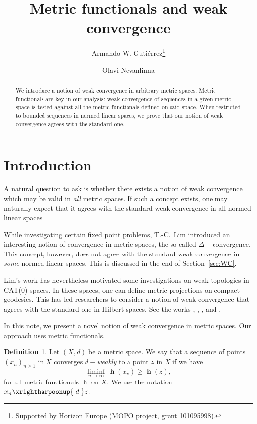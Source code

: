 \documentclass[a4paper,12pt]{article}
\title{\bf Metric functionals and weak convergence}
\author[1]{Armando W. Guti\'{e}rrez\thanks{
	Supported by Horizon Europe (MOPO project, grant 101095998).}}
\affil[1]{\itshape\small VTT Technical 
Research Centre of Finland \protect\\ 
\emph{armando.w.gutierrez@vtt.fi}}
\author[2]{Olavi Nevanlinna}
\affil[2]{\itshape\small Department of 
Mathematics and Systems Analysis, 
Aalto University \protect\\ 
\emph{olavi.nevanlinna@aalto.fi}}
\date{}
\theoremstyle{definition}
\newtheorem{defn}[thm]{Definition}
\DeclareMathOperator{\h}{\mathbf{h}}
\numberwithin{equation}{section}
\begin{document}
\maketitle

\begin{abstract}
We introduce a notion of weak convergence in arbitrary metric spaces. Metric 
functionals are key in our analysis: weak convergence of sequences in a given 
metric space is tested against all the metric functionals defined on said space. 
When restricted to bounded sequences in normed linear spaces, we prove that 
our notion of weak convergence agrees with the standard one.
\end{abstract}

\section{Introduction}

A natural question to ask is whether there exists a notion of weak convergence 
which may be valid in \emph{all} metric spaces. If such a concept exists, one may
naturally expect that it agrees with the standard weak convergence in all normed 
linear spaces. 

While investigating certain fixed point problems, T.-C.~Lim \cite{Lim1977}
introduced an interesting notion of convergence in metric spaces, the so-called 
$\Delta-$convergence. This concept, however, does not agree with the standard weak 
convergence in \emph{some} normed linear spaces. This is discussed in the end of
Section~\ref{sec:WC}. 

Lim's work has nevertheless motivated some investigations on weak topologies in 
{CAT}($0$) spaces. In these spaces, one can define metric projections on compact 
geodesics. This has led researchers to consider a notion of weak convergence 
that agrees with the standard one in Hilbert spaces. See the works 
\cite{Kirk2008}, \cite{Espinola-Fernandez2009},
\cite{Bacak2023}, and \cite{Lytchak-Petrunin2023}. 

In this note, we present a novel notion of weak convergence in metric spaces. Our 
approach uses metric functionals. 

\begin{defn}\label{def:WeakConv}
Let $(X,d)$ be a metric space. We say that a sequence of points $(x_n)_{n\geq 1}$ 
in $X$ converges \emph{$d-$weakly} to a point $z$ in $X$ if we have
\begin{equation}\label{eq:LiminfIneq}
	\liminf_{n\to\infty}\,\h(x_n) \geq \h(z),
\end{equation}
for all metric functionals $\h$ on $X$. We use the notation 
$x_n \xrightharpoonup{\;d\;} z$.
\end{defn}
\end{document}
